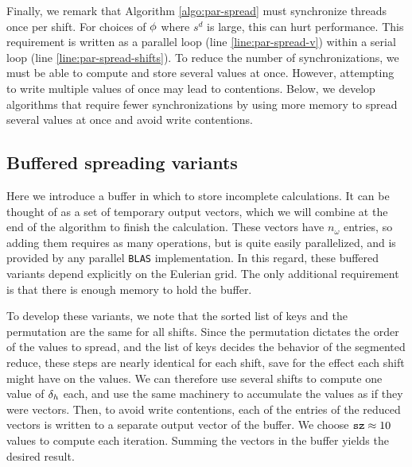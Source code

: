 Finally, we remark that Algorithm \ref{algo:par-spread} must synchronize threads once per
shift. For choices of $\phi$ where $s^d$ is large, this can hurt performance. This
requirement is written as a parallel loop (line \ref{line:par-spread-v}) within a serial
loop (line \ref{line:par-spread-shifts}). To reduce the number of synchronizations, we
must be able to compute and store several values at once. However, attempting to write
multiple values of once may lead to contentions. Below, we develop algorithms that
require fewer synchronizations by using more memory to spread several values at once and
avoid write contentions.

\subsection{Buffered spreading variants}

Here we introduce a buffer in which to store incomplete calculations. It can be thought
of as a set of temporary output vectors, which we will combine at the end of the
algorithm to finish the calculation. These vectors have $n_\omega$ entries, so adding
them requires as many operations, but is quite easily parallelized, and is provided by
any parallel \texttt{BLAS} implementation. In this regard, these buffered variants depend
explicitly on the Eulerian grid. The only additional requirement is that there is enough
memory to hold the buffer. 

To develop these variants, we note that the sorted list of keys and the permutation
are the same for all shifts. Since the permutation dictates the order of the values to
spread, and the list of keys decides the behavior of the segmented reduce, these steps
are nearly identical for each shift, save for the effect each shift might have on the
values. We can therefore use several shifts to compute one value of $\delta_h$ each, and
use the same machinery to accumulate the values as if they were vectors. Then, to avoid
write contentions, each of the entries of the reduced vectors is written to a separate
output vector of the buffer. We choose $\texttt{sz}\approx 10$ values to compute each
iteration. Summing the vectors in the buffer yields the desired result.

